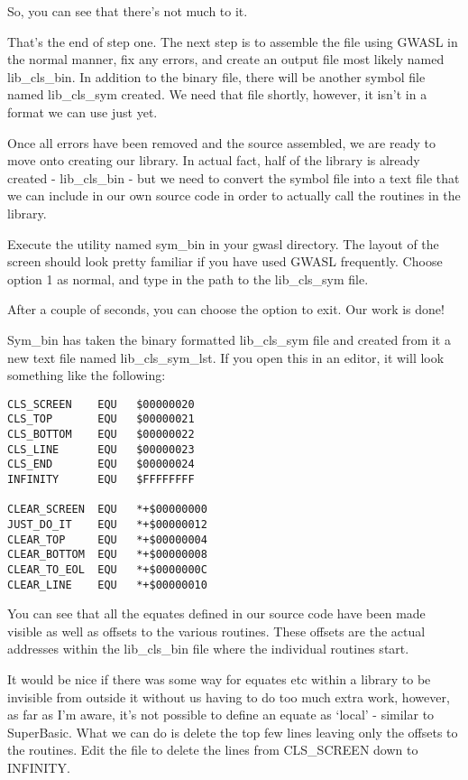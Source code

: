 So, you can see that there's not much to it. 

That's the end of step one. The next step is to assemble the file
    using GWASL in the normal manner, fix any
    errors, and create an output file most likely named
 lib\_cls\_bin. In addition to the binary file, there
    will be another symbol file named lib\_cls\_sym     created. We need that file shortly, however, it isn't in a format we can
    use just yet.

Once all errors have been removed and the source assembled, we are
    ready to move onto creating our library. In actual fact, half of the
    library is already created -{} lib\_cls\_bin -{} but we
    need to convert the symbol file into a text file that we can include in
    our own source code in order to actually call the routines in the
    library.

Execute the utility named sym\_bin in your
    gwasl directory. The layout of the screen should look pretty familiar if
    you have used GWASL frequently. Choose option 1
    as normal, and type in the path to the lib\_cls\_sym file.

After a couple of seconds, you can choose the option to exit. Our
    work is done!

Sym\_bin has taken the binary formatted
 lib\_cls\_sym file and created from it a new text file
    named lib\_cls\_sym\_lst. If you open this in an editor,
    it will look something like the following:

\begin{lstlisting}[firstnumber=1,caption={Example Library - Lib\_cls\_sym\_lst},label={lst:LibClsSymLst},language={}]
CLS_SCREEN    EQU   $00000020
CLS_TOP       EQU   $00000021
CLS_BOTTOM    EQU   $00000022
CLS_LINE      EQU   $00000023
CLS_END       EQU   $00000024
INFINITY      EQU   $FFFFFFFF

CLEAR_SCREEN  EQU   *+$00000000
JUST_DO_IT    EQU   *+$00000012
CLEAR_TOP     EQU   *+$00000004
CLEAR_BOTTOM  EQU   *+$00000008
CLEAR_TO_EOL  EQU   *+$0000000C
CLEAR_LINE    EQU   *+$00000010
\end{lstlisting}

You can see that all the equates defined in our source code have
    been made visible as well as offsets to the various routines. These
    offsets are the actual addresses within the
 lib\_cls\_bin file where the individual routines start.
 

It would be nice if there was some way for equates etc within a
    library to be invisible from outside it without us having to do too much
    extra work, however, as far as I'm aware, it's not possible to define an
    equate as `local' -{} similar to SuperBasic. What we can do is delete the
    top few lines leaving only the offsets to the routines. Edit the file to
    delete the lines from CLS\_SCREEN down to INFINITY. 

